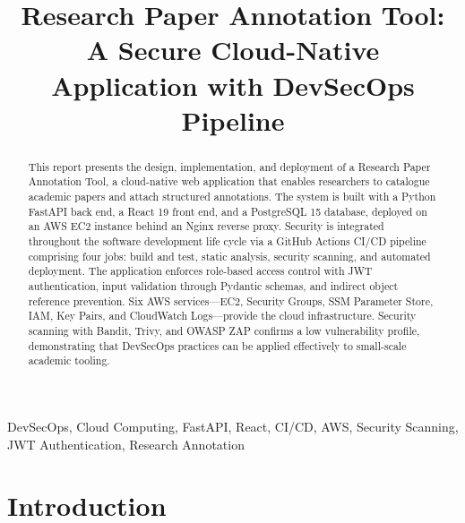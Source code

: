 \documentclass[conference]{IEEEtran}
\begin{document}
\title{Research Paper Annotation Tool: A Secure Cloud-Native\\Application with DevSecOps Pipeline}

\author{
}

\maketitle

\begin{abstract}
This report presents the design, implementation, and deployment of a Research Paper Annotation Tool, a cloud-native web application that enables researchers to catalogue academic papers and attach structured annotations. The system is built with a Python FastAPI back end, a React 19 front end, and a PostgreSQL 15 database, deployed on an AWS EC2 instance behind an Nginx reverse proxy. Security is integrated throughout the software development life cycle via a GitHub Actions CI/CD pipeline comprising four jobs: build and test, static analysis, security scanning, and automated deployment. The application enforces role-based access control with JWT authentication, input validation through Pydantic schemas, and indirect object reference prevention. Six AWS services---EC2, Security Groups, SSM Parameter Store, IAM, Key Pairs, and CloudWatch Logs---provide the cloud infrastructure. Security scanning with Bandit, Trivy, and OWASP ZAP confirms a low vulnerability profile, demonstrating that DevSecOps practices can be applied effectively to small-scale academic tooling.
\end{abstract}

\begin{IEEEkeywords}
DevSecOps, Cloud Computing, FastAPI, React, CI/CD, AWS, Security Scanning, JWT Authentication, Research Annotation
\end{IEEEkeywords}

\section{Introduction}
\label{sec:introduction}
\end{document}
